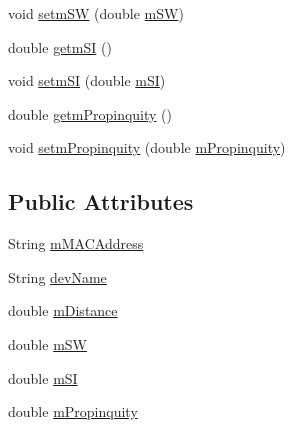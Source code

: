 \begin{DoxyCompactItemize}
\item 
void \hyperlink{classcs_1_1nsense_1_1inference_module_1_1_social_interaction_1_1_device_details_a81856603731397bb3cca24737caa8ee0}{setm\-S\-W} (double \hyperlink{classcs_1_1nsense_1_1inference_module_1_1_social_interaction_1_1_device_details_a930736e6b55ac81ece0af6bfd2ea0d40}{m\-S\-W})
\item 
double \hyperlink{classcs_1_1nsense_1_1inference_module_1_1_social_interaction_1_1_device_details_a0650e84e35130b37fa6cc46f3b6f7a63}{getm\-S\-I} ()
\item 
void \hyperlink{classcs_1_1nsense_1_1inference_module_1_1_social_interaction_1_1_device_details_ab2c6268bf9b0a16ea55b9f5a8d1a2666}{setm\-S\-I} (double \hyperlink{classcs_1_1nsense_1_1inference_module_1_1_social_interaction_1_1_device_details_abdb4948ecddcb717574d9c365147380c}{m\-S\-I})
\item 
double \hyperlink{classcs_1_1nsense_1_1inference_module_1_1_social_interaction_1_1_device_details_a8364bee4a7a3a3829feb86368e3c1793}{getm\-Propinquity} ()
\item 
void \hyperlink{classcs_1_1nsense_1_1inference_module_1_1_social_interaction_1_1_device_details_a809f3f8e89c48524ccf17d3a27fec9e6}{setm\-Propinquity} (double \hyperlink{classcs_1_1nsense_1_1inference_module_1_1_social_interaction_1_1_device_details_a723d838b5f97875b813f05b6d7ccec2d}{m\-Propinquity})
\end{DoxyCompactItemize}
\subsection*{Public Attributes}
\begin{DoxyCompactItemize}
\item 
String \hyperlink{classcs_1_1nsense_1_1inference_module_1_1_social_interaction_1_1_device_details_a48377283d98c2c51e87c4720bbad9063}{m\-M\-A\-C\-Address}
\item 
String \hyperlink{classcs_1_1nsense_1_1inference_module_1_1_social_interaction_1_1_device_details_abae55da3f92cedbea10c2ed2c0b65061}{dev\-Name}
\item 
double \hyperlink{classcs_1_1nsense_1_1inference_module_1_1_social_interaction_1_1_device_details_acb7dbaa686bf2b2605bf93a89f4e3feb}{m\-Distance}
\item 
double \hyperlink{classcs_1_1nsense_1_1inference_module_1_1_social_interaction_1_1_device_details_a930736e6b55ac81ece0af6bfd2ea0d40}{m\-S\-W}
\item 
double \hyperlink{classcs_1_1nsense_1_1inference_module_1_1_social_interaction_1_1_device_details_abdb4948ecddcb717574d9c365147380c}{m\-S\-I}
\item 
double \hyperlink{classcs_1_1nsense_1_1inference_module_1_1_social_interaction_1_1_device_details_a723d838b5f97875b813f05b6d7ccec2d}{m\-Propinquity}
\end{DoxyCompactItemize}


